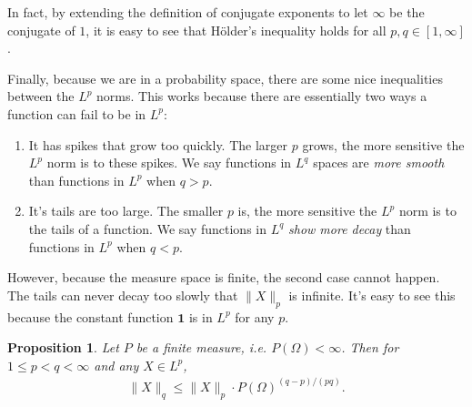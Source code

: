 \documentclass[11pt,reqno]{amsart}
\newtheorem{proposition}[theorem]{Proposition}
\theoremstyle{definition}
\theoremstyle{remark}
\begin{document}
In fact, by extending the definition of conjugate exponents to let $\infty$ be the conjugate of \(1\), it is easy to see that Hölder's inequality holds for all \(p, q \in [1, \infty]\).

Finally, because we are in a probability space, there are some nice inequalities between the \(L^p\) norms. This works because there are essentially two ways a function can fail to be in \(L^p\):
\begin{enumerate}
	\item It has spikes that grow too quickly. The larger \(p\) grows, the more sensitive the \(L^p\) norm is to these spikes. We say functions in \(L^{q}\) spaces are \emph{more smooth} than functions in \(L^{p}\) when \(q > p\).
	\item It's tails are too large. The smaller \(p\) is, the more sensitive the \(L^p\) norm is to the tails of a function. We say functions in \(L^{q}\) \emph{show more decay} than functions in \(L^{p}\) when \(q < p\).
\end{enumerate}
However, because the measure space is finite, the second case cannot happen. The tails can never decay too slowly that \(\|X\|_p\) is infinite. It's easy to see this because the constant function \(\mathbf{1}\) is in \(L^p\) for any \(p\).

\begin{proposition}
	Let \(P\) be a finite measure, i.e. \(P(\Omega) < \infty\). Then for \(1 \leq p < q < \infty\) and any $X \in L^p$,
	\begin{align*}
		\|X\|_q \leq \|X\|_p \cdot P(\Omega)^{(q-p)/(pq)}.
	\end{align*}
\end{proposition}
\end{document}
